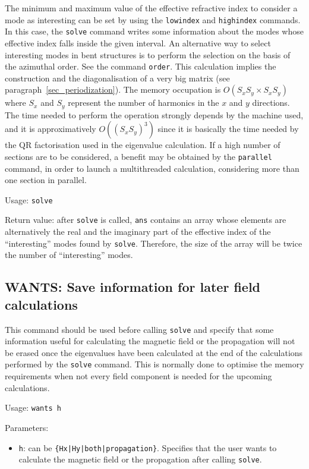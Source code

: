 The minimum and maximum value of the effective refractive index to consider a mode as interesting can be set by using the \lstinline!lowindex! and \lstinline!highindex! commands. In this case, the \lstinline!solve! command writes some information about the modes whose effective index falls inside the given interval. An alternative way to select interesting modes in bent structures is to perform the selection on the basis of the azimuthal order. See the command \lstinline!order!.
This calculation implies the construction and the diagonalisation of a very big matrix (see paragraph~\ref{sec_periodization}). The memory occupation is $O(S_{x}S_{y}\times S_{x}S_{y})$ where $S_{x}$ and $S_{y}$ represent the number of harmonics in the $x$ and $y$ directions. The time needed to perform the operation strongly depends by the machine used, and it is approximatively $O((S_{x}S_{y})^3)$ since it is basically the time needed by the QR factorisation used in the eigenvalue calculation. If a high number of sections are to be considered, a benefit may be obtained by the \lstinline!parallel! command, in order to launch a multithreaded calculation, considering more than one section in parallel.

Usage: \lstinline!solve!

Return value: after \lstinline!solve! is called, \lstinline!ans! contains an array whose elements are alternatively the real and the imaginary part of the effective index of the ``interesting'' modes found by \lstinline!solve!. Therefore, the size of the array will be twice the number of ``interesting'' modes.


\subsection{WANTS: Save information for later field calculations}
\label{subsec_wants}
This command should be used before calling \lstinline!solve! and specify that some information useful for calculating the magnetic field or the propagation will not be erased once the eigenvalues have been calculated at the end of the calculations performed by the \lstinline!solve! command. This is normally done to optimise the memory requirements when not every field component is needed for the upcoming calculations.

    Usage: \lstinline!wants h!
    
    Parameters:
    \begin{itemize}
    \item \lstinline!h!: can be \lstinline!{Hx|Hy|both|propagation}!. Specifies that the user wants to calculate the magnetic field or the propagation after calling \lstinline!solve!. 
    \end{itemize}
    
